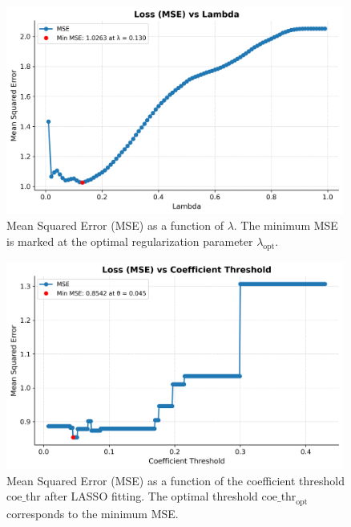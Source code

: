 \begin{figure}
	\begin{center}
		\includegraphics[width=0.99\textwidth]{../images/lasso/mse_vs_lambda.png}
	\end{center}
	\caption{Mean Squared Error (MSE) as a function of \(\lambda\). The minimum
		MSE is marked at the optimal regularization parameter
		\(\lambda_{\text{opt}}\).}
	\label{fig:figA9}
\end{figure}

\begin{figure}
	\begin{center}
		\includegraphics[width=0.99\textwidth]{../images/lasso/mse_vs_threshold.png}
	\end{center}
	\caption{Mean Squared Error (MSE) as a function of the coefficient threshold
	\(\text{coe\_thr}\) after LASSO fitting. The optimal threshold
	\(\text{coe\_thr}_{\text{opt}}\) corresponds to the minimum MSE.}
	\label{fig:figA10}
\end{figure}

